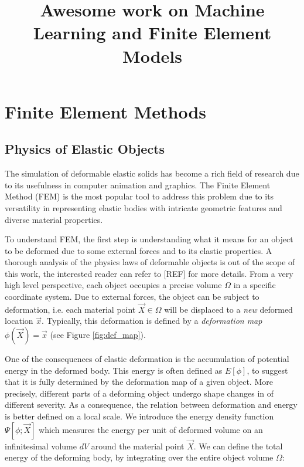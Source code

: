 \documentclass{article} %
\title{Awesome work on Machine Learning and Finite Element Models}
\begin{document}
\maketitle


\section{Finite Element Methods}

\subsection{Physics of Elastic Objects}

The simulation of deformable elastic solids has become a rich field of research due to its usefulness in computer animation and graphics. The Finite Element Method (FEM) is the most popular tool to address this problem due to its versatility in representing elastic bodies with intricate geometric features and diverse material properties. 

To understand FEM, the first step is understanding what it means for an object to be deformed due to some external forces and to its elastic properties. A thorough analysis of the physics laws of deformable objects is out of the scope of this work, the interested reader can refer to [REF] for more details. From a very high level perspective, each object occupies a precise volume $\Omega$ in a specific coordinate system. Due to external forces, the object can be subject to deformation, i.e. each material point $\overrightarrow{X} \in \Omega$ will be displaced to a \emph{new} deformed location $\overrightarrow{x}$. Typically, this deformation is defined by a \emph{deformation map} $\phi(\overrightarrow{X}) = \overrightarrow{x}$ (see Figure \ref{fig:def_map}).

One of the consequences of elastic deformation is the accumulation of potential energy  in the deformed body. This energy is often defined as $E[\phi]$, to suggest that it is fully determined by the deformation map of a given object. More precisely, different parts of a deforming object undergo shape changes in of different severity. As a consequence, the relation between deformation and energy is better defined on a local scale. We introduce the energy density function $\Psi[\phi ; \overrightarrow{X}]$ which measures the energy per unit of deformed volume on an infinitesimal volume $dV$ around the material point $\overrightarrow{X}$. We can define the total energy of the deforming body, by integrating over the entire object volume $\Omega$: 
\end{document}
